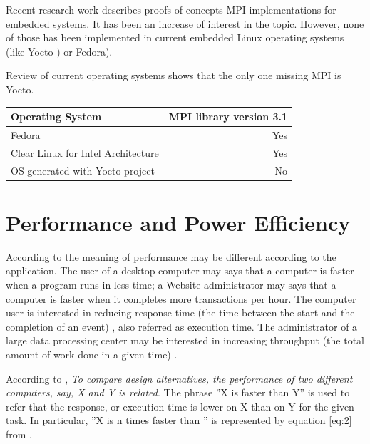 Recent research work \cite{Saldana} \cite{Gallego} \cite{McMahon} describes
proofs-of-concepts MPI implementations for embedded systems. It has been an
increase of interest in the topic. However, none of those has been implemented
in current embedded Linux operating systems (like Yocto \cite{yocto-project})
or Fedora\cite{fedora}).

Review of current operating systems shows that the only
one missing  MPI is Yocto.


\begin{center}
\begin{tabular}{ | l | r |}
    \hline
    \textbf{Operating System} & \textbf{MPI library version 3.1}  \\ \hline
    Fedora & Yes  \\ \hline
    Clear Linux for Intel Architecture & Yes \\ \hline
    OS generated with Yocto project & No \\ \hline
\end{tabular}
\label{tab:4.2}
\end{center}


\section{Performance and Power Efficiency}

\noindent

According to \cite{Hennessy} the meaning of performance may be different according to the application.
The user of a desktop computer may says that  a computer is faster when a program runs in less
time; a Website administrator may says that a computer is faster when it
completes more transactions per hour. The computer user is interested in 
reducing response time (the time between the start and the completion of an 
event) \cite{Hennessy}, also referred as execution time. The administrator of a large data 
processing center may be interested in increasing throughput (the total amount 
of work done in a given time) \cite{Hennessy}. 

According to \cite{Hennessy}, \textit{ To compare design alternatives, the
performance of two different computers, say, X and Y is related}. The phrase ''X
is faster than Y'' is used to refer that the response, or execution
time is lower on X than on Y for the given task. In particular, ''X is n times
faster than ''  is represented by equation \ref{eq:2} from \cite{Hennessy}.

